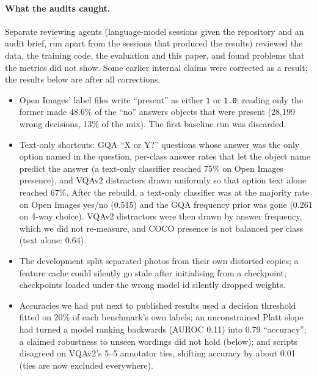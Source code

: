 \documentclass[10pt]{article}
\begin{document}
\paragraph{What the audits caught.} Separate reviewing agents (language-model sessions given the repository and an audit brief, run apart from the sessions that produced the results) reviewed the data, the training code, the evaluation and this paper, and found problems that the metrics did not show. Some earlier internal claims were corrected as a result; the results below are after all corrections.
\begin{itemize}\setlength\itemsep{1pt}
\item Open Images' label files write ``present'' as either \texttt{1} or \texttt{1.0}; reading only the former made 48.6\% of the ``no'' answers objects that were present (28{,}199 wrong decisions, 13\% of the mix). The first baseline run was discarded.
\item Text-only shortcuts: GQA ``X or Y?'' questions whose answer was the only option named in the question, per-class answer rates that let the object name predict the answer (a text-only classifier reached 75\% on Open Images presence), and VQAv2 distractors drawn uniformly so that option text alone reached 67\%. After the rebuild, a text-only classifier was at the majority rate on Open Images yes/no (0.515) and the GQA frequency prior was gone (0.261 on 4-way choice). VQAv2 distractors were then drawn by answer frequency, which we did not re-measure, and COCO presence is not balanced per class (text alone: 0.64).
\item The development split separated photos from their own distorted copies; a feature cache could silently go stale after initialising from a checkpoint; checkpoints loaded under the wrong model id silently dropped weights.
\item Accuracies we had put next to published results used a decision threshold fitted on 20\% of each benchmark's own labels; an unconstrained Platt slope had turned a model ranking backwards (AUROC 0.11) into 0.79 ``accuracy''; a claimed robustness to unseen wordings did not hold (below); and scripts disagreed on VQAv2's 5--5 annotator ties, shifting accuracy by about 0.01 (ties are now excluded everywhere).
\end{itemize}
\end{document}
